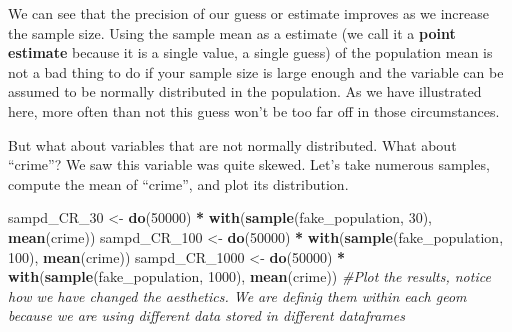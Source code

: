 \documentclass[]{book}
\newenvironment{Shaded}{\begin{snugshade}}{\end{snugshade}}
\newcommand{\CommentTok}[1]{\textcolor[rgb]{0.56,0.35,0.01}{\textit{#1}}}
\newcommand{\DecValTok}[1]{\textcolor[rgb]{0.00,0.00,0.81}{#1}}
\newcommand{\KeywordTok}[1]{\textcolor[rgb]{0.13,0.29,0.53}{\textbf{#1}}}
\newcommand{\NormalTok}[1]{#1}
\newcommand{\OperatorTok}[1]{\textcolor[rgb]{0.81,0.36,0.00}{\textbf{#1}}}
\newcommand{\StringTok}[1]{\textcolor[rgb]{0.31,0.60,0.02}{#1}}
\theoremstyle{definition}
\theoremstyle{definition}
\theoremstyle{definition}
\theoremstyle{remark}
\begin{document}
We can see that the precision of our guess or estimate improves as we
increase the sample size. Using the sample mean as a estimate (we call
it a \textbf{point estimate} because it is a single value, a single
guess) of the population mean is not a bad thing to do if your sample
size is large enough and the variable can be assumed to be normally
distributed in the population. As we have illustrated here, more often
than not this guess won't be too far off in those circumstances.

But what about variables that are not normally distributed. What about
``crime''? We saw this variable was quite skewed. Let's take numerous
samples, compute the mean of ``crime'', and plot its distribution.

\begin{Shaded}
\begin{Highlighting}[]
\NormalTok{sampd_CR_}\DecValTok{30}\NormalTok{ <-}\StringTok{ }\KeywordTok{do}\NormalTok{(}\DecValTok{50000}\NormalTok{) }\OperatorTok{*}\StringTok{ }\KeywordTok{with}\NormalTok{(}\KeywordTok{sample}\NormalTok{(fake_population, }\DecValTok{30}\NormalTok{), }\KeywordTok{mean}\NormalTok{(crime))}
\NormalTok{sampd_CR_}\DecValTok{100}\NormalTok{ <-}\StringTok{ }\KeywordTok{do}\NormalTok{(}\DecValTok{50000}\NormalTok{) }\OperatorTok{*}\StringTok{ }\KeywordTok{with}\NormalTok{(}\KeywordTok{sample}\NormalTok{(fake_population, }\DecValTok{100}\NormalTok{), }\KeywordTok{mean}\NormalTok{(crime))}
\NormalTok{sampd_CR_}\DecValTok{1000}\NormalTok{ <-}\StringTok{ }\KeywordTok{do}\NormalTok{(}\DecValTok{50000}\NormalTok{) }\OperatorTok{*}\StringTok{ }\KeywordTok{with}\NormalTok{(}\KeywordTok{sample}\NormalTok{(fake_population, }\DecValTok{1000}\NormalTok{), }\KeywordTok{mean}\NormalTok{(crime))}
\CommentTok{#Plot the results, notice how we have changed the aesthetics. We are definig them within each geom because we are using different data stored in different dataframes}
\end{Highlighting}
\end{Shaded}
\end{document}
